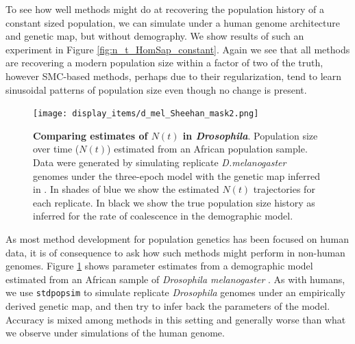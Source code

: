 \documentclass[12pt,halfline,a4paper]{ouparticle}
\newcommand{\stdpopsim}{\texttt{stdpopsim}\xspace}
\begin{document}
To see how well methods might do at recovering the population history of a constant sized population,
we can simulate under a human genome architecture and genetic map, but without demography.
We show results of such an
experiment in Figure \ref{fig:n_t_HomSap_constant}. Again we see that all methods
are recovering a modern population size within a factor of two of the truth, however
SMC-based methods, perhaps due to their regularization, tend to learn sinusoidal
patterns of population size even though no change is present.


\begin{figure}
\begin{center}
\texttt{[image: display\_items/d\_mel\_Sheehan\_mask2.png]}
\caption{\textbf{Comparing estimates of $N(t)$ in \emph{Drosophila}}. Population
size over time ($N(t)$) estimated from an African population sample. Data were generated by simulating
replicate \emph{D.melanogaster} genomes under the three-epoch \cite{sheehan2016deep} model
with the genetic map inferred in \cite{comeron2012many}. In shades of blue we show the estimated
$N(t)$ trajectories for each replicate. In black we show the true population size history as inferred
for the rate of coalescence in the demographic model.}
\label{fig:n_t_sheehan}
\end{center}
\end{figure}

As most method development for population genetics has been focused on human
data, it is of consequence to ask how such methods might perform in non-human
genomes. Figure \ref{fig:n_t_sheehan} shows parameter estimates from a demographic
model estimated from an African sample of \emph{Drosophila melanogaster} \citep{sheehan2016deep}.
As with humans, we use \stdpopsim to simulate replicate \emph{Drosophila} genomes under
an empirically derived genetic map, and then try to infer back the parameters of the model.
Accuracy is mixed among methods in this setting and generally worse than what we
observe under simulations of the human genome.
\end{document}
